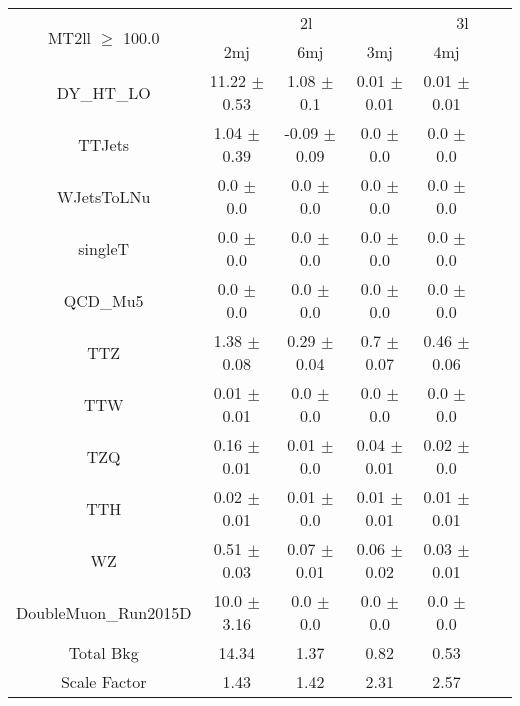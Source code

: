 \documentclass[8pt,landscape]{article}
\begin{document}
\begin{tabular}{|c||c|c|c||c|c|c|}
\hline
\multirow{2}{*}{MT2ll $\geq$ 100.0}& \multicolumn{3}{|c||}{2l}& \multicolumn{3}{|c|}{3l}\\ \cline{2-7} 
& 2mj& 6mj& 3mj& 4mj\\ \hline \hline 
DY\_HT\_LO & 11.22 $\pm$ 0.53 & 1.08 $\pm$ 0.1 & 0.01 $\pm$ 0.01 & 0.01 $\pm$ 0.01\\ \hline 
TTJets & 1.04 $\pm$ 0.39 & -0.09 $\pm$ 0.09 & 0.0 $\pm$ 0.0 & 0.0 $\pm$ 0.0\\ \hline 
WJetsToLNu & 0.0 $\pm$ 0.0 & 0.0 $\pm$ 0.0 & 0.0 $\pm$ 0.0 & 0.0 $\pm$ 0.0\\ \hline 
singleT & 0.0 $\pm$ 0.0 & 0.0 $\pm$ 0.0 & 0.0 $\pm$ 0.0 & 0.0 $\pm$ 0.0\\ \hline 
QCD\_Mu5 & 0.0 $\pm$ 0.0 & 0.0 $\pm$ 0.0 & 0.0 $\pm$ 0.0 & 0.0 $\pm$ 0.0\\ \hline 
TTZ & 1.38 $\pm$ 0.08 & 0.29 $\pm$ 0.04 & 0.7 $\pm$ 0.07 & 0.46 $\pm$ 0.06\\ \hline 
TTW & 0.01 $\pm$ 0.01 & 0.0 $\pm$ 0.0 & 0.0 $\pm$ 0.0 & 0.0 $\pm$ 0.0\\ \hline 
TZQ & 0.16 $\pm$ 0.01 & 0.01 $\pm$ 0.0 & 0.04 $\pm$ 0.01 & 0.02 $\pm$ 0.0\\ \hline 
TTH & 0.02 $\pm$ 0.01 & 0.01 $\pm$ 0.0 & 0.01 $\pm$ 0.01 & 0.01 $\pm$ 0.01\\ \hline 
WZ & 0.51 $\pm$ 0.03 & 0.07 $\pm$ 0.01 & 0.06 $\pm$ 0.02 & 0.03 $\pm$ 0.01\\ \hline 
DoubleMuon\_Run2015D & 10.0 $\pm$ 3.16 & 0.0 $\pm$ 0.0 & 0.0 $\pm$ 0.0 & 0.0 $\pm$ 0.0\\ \hline 
\hline
Total Bkg & 14.34 & 1.37 & 0.82 & 0.53 \\ \hline
Scale Factor & 1.43 & 1.42 & 2.31 & 2.57 \\ \hline
\end{tabular}
\end{document}
